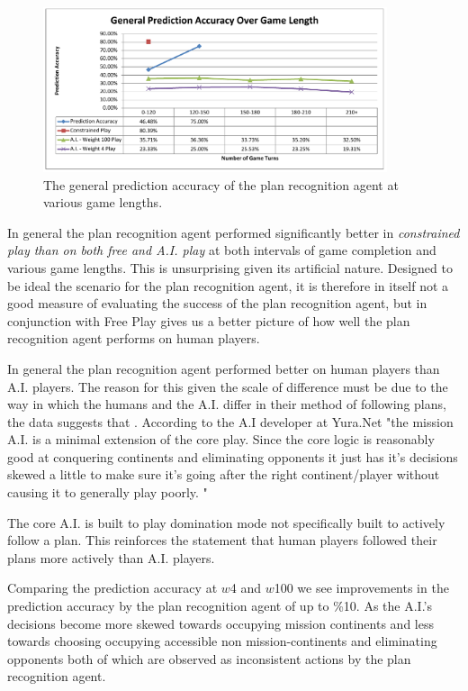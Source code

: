 \documentclass[parskip]{cs4rep}
\begin{document}
\begin{figure}[h]
\centerline{
\includegraphics[width=0.9\textwidth]{images/general-game-length.pdf}
}
\caption{The general prediction accuracy of the plan recognition agent at various game lengths. }
\label{fig:dom-debug-gui}
\end{figure} 

In general the plan recognition agent performed significantly better in \textit{constrained play than on both free and A.I. play} at both intervals of game completion and various game lengths. This is unsurprising given its artificial nature. Designed to be ideal the scenario for the plan recognition agent, it is therefore in itself not a good measure of evaluating the success of the plan recognition agent, but in conjunction with Free Play gives us a better picture of how well the plan recognition agent performs on human players.

In general the plan recognition agent performed better on human players than A.I. players. The reason for this given the scale of difference must be due to the way in which the humans and the A.I. differ in their method of following plans, the data suggests that . According to the A.I developer at Yura.Net "the mission A.I. is a minimal extension of the core play. Since the core logic is reasonably good at conquering continents and eliminating opponents it just has it's decisions skewed a little to make sure it's going after the right continent/player without causing it to generally play poorly. "

The core A.I. is built to play domination mode not specifically built to actively follow a plan. This reinforces the statement that human players followed their plans more actively than A.I. players.

Comparing the prediction accuracy at $w$4 and $w$100 we see improvements in the prediction accuracy by the plan recognition agent of up to \%10. As the A.I.'s decisions become more skewed towards occupying mission continents and less towards choosing occupying accessible non mission-continents and eliminating opponents both of which are observed as inconsistent actions by the plan recognition agent.
\end{document}
